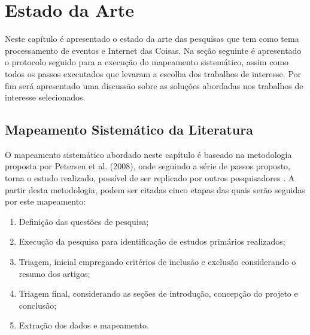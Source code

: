 \documentclass[ti,table]{texufpel} %
\begin{document}
  

  

  


  


\chapter{Estado da Arte}  

\label{cap:Estado_da_Arte} 

  

Neste capítulo é apresentado o estado da arte das pesquisas que tem como tema processamento de eventos e Internet das Coisas. Na seção seguinte é apresentado o protocolo seguido para a execução do mapeamento sistemático, assim como todos os passos executados que levaram a escolha dos trabalhos de interesse. Por fim será apresentado uma discussão sobre as soluções abordadas nos trabalhos de interesse selecionados.     

  

\section{Mapeamento Sistemático da Literatura} 

  

O mapeamento sistemático abordado neste capítulo é baseado na metodologia proposta por Petersen et al. (2008), onde seguindo a série de passos proposto, torna o estudo realizado, possível de ser replicado por outros pesquisadores \cite{petersen08}. A partir desta metodologia, podem ser citadas cinco etapas das quais serão seguidas por este mapeamento: 

  

\begin{enumerate} 

    \item Definição das questões de pesquisa; 

    \item Execução da pesquisa para identificação de estudos primários realizados; 

    \item Triagem, inicial empregando critérios de inclusão e exclusão considerando o resumo dos artigos; 

    \item Triagem final, considerando as seções de introdução, concepção do projeto e conclusão; 

    \item Extração dos dados e mapeamento. 

     

  

\end{enumerate}   
\end{document}
